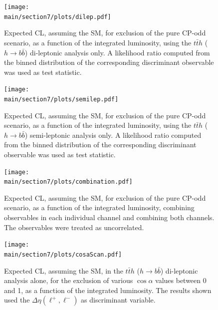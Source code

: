 \documentclass[../report.tex]{subfiles}
\providecommand{\main}{..}
\begin{document}
\begin{figure}[h]
\centering
\begin{minipage}{0.45\textwidth}
 \texttt{[image: \\main/section7/plots/dilep.pdf]}
 \caption{Expected CL, assuming the SM, for exclusion of the pure CP-odd scenario, as a function of the integrated luminosity, using the $t\bar{t}h$ ($h\rightarrow b\bar{b}$) di-leptonic analysis only. A likelihood ratio computed from the binned distribution of the corresponding discriminant observable was used as test statistic.}
 \label{dilep}
\end{minipage}
\hfill
\begin{minipage}{0.45\textwidth}
 \texttt{[image: \\main/section7/plots/semilep.pdf]}
 \caption{Expected CL, assuming the SM, for exclusion of the pure CP-odd scenario, as a function of the integrated luminosity, using the $t\bar{t}h$ ($h\rightarrow b\bar{b}$)  semi-leptonic analysis only. A likelihood ratio computed from the binned distribution of the corresponding discriminant observable was used as test statistic.}
 \label{semilep}
\end{minipage}
%
\begin{minipage}{0.45\textwidth}
 \texttt{[image: \\main/section7/plots/combination.pdf]}
 \caption{Expected CL, assuming the SM, for exclusion of the pure CP-odd scenario, as a function of the integrated luminosity, combining observables in each individual channel and combining both channels. The observables were treated as uncorrelated.}
 \label{combination}
\end{minipage}
\hfill
\begin{minipage}{0.45\textwidth}
 \texttt{[image: \\main/section7/plots/cosaScan.pdf]}
 \caption{Expected CL, assuming the SM, in the $t\bar{t}h$ ($h\rightarrow b\bar{b}$) di-leptonic analysis alone, for the exclusion of various $\cos\alpha$ values between 0 and 1, as a function of the integrated luminosity. The results shown used the $\Delta\eta(\ell^+,\ell^-)$ as discriminant variable.}
 \label{cosaScan}
\end{minipage}
%
\end{figure}
\end{document}
